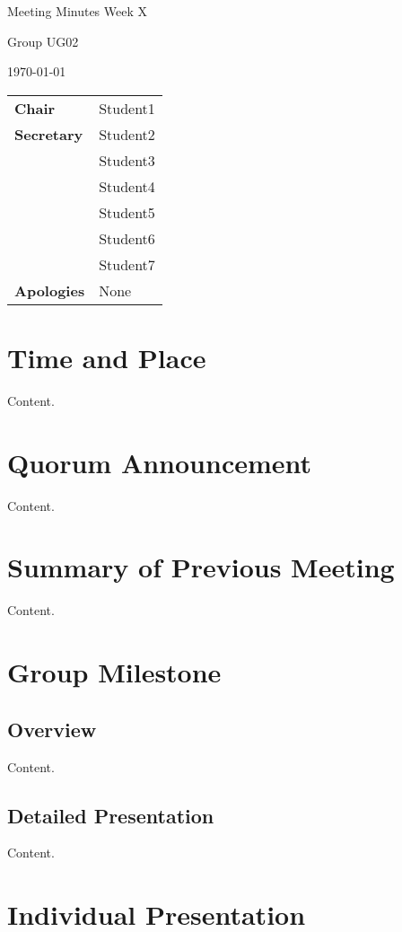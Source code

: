 \documentclass[11pt, a4paper]{article}
\begin{document}
\begin{center}    
{\huge Meeting Minutes Week X \par}
\vspace{0.5cm}
{\large Group UG02 \par}
\vspace{0.5cm}
{\large \today \par}
\vspace{0.5cm}
\end{center}

\begin{flushleft}
\begin{tabular}{ll}
{\bfseries Chair} & Student1 \\
{\bfseries Secretary} & Student2 \\
 & Student3 \\
 & Student4 \\
 & Student5 \\
 & Student6 \\
 & Student7 \\
{\bfseries Apologies} & None\\
\end{tabular}
\end{flushleft}

\section{Time and Place}
	Content.
\section{Quorum Announcement}
	Content.
\section{Summary of Previous Meeting}
	Content.
\section{Group Milestone}
	\subsection{Overview}
		Content.
	\subsection{Detailed Presentation}
		Content.
\section{Individual Presentation}
\end{document}
